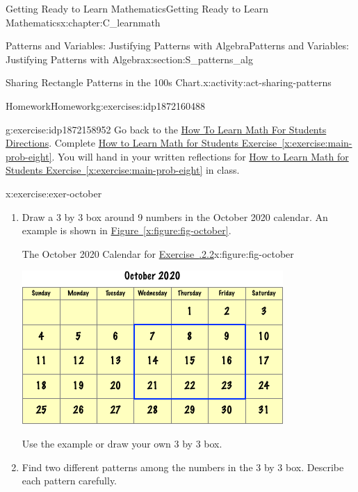 \documentclass[oneside,10pt,]{book}
\newcommand{\xreffont}{\relax}
\numberwithin{equation}{chapter}
\begin{document}
\begin{chapterptx}{Getting Ready to Learn Mathematics}{}{Getting Ready to Learn Mathematics}{}{}{x:chapter:C_learnmath}
\begin{sectionptx}{Patterns and Variables: Justifying Patterns with Algebra}{}{Patterns and Variables: Justifying Patterns with Algebra}{}{}{x:section:S_patterns_alg}
\begin{activity}{Sharing Rectangle Patterns in the 100s Chart.}{x:activity:act-sharing-patterns}
\end{activity}%
%
%
\typeout{************************************************}
\typeout{************************************************}
%
\begin{exercises-subsection}{Homework}{}{Homework}{}{}{g:exercises:idp1872160488}
\begin{divisionexercise}{1}{}{}{g:exercise:idp1872158952}%
Go back to the \hyperlink{x:paragraphs:htlmfs-directions}{How To Learn Math For Students Directions}. Complete \hyperref[x:exercise:main-prob-eight]{How to Learn Math for Students Exercise~{\xreffont\ref{x:exercise:main-prob-eight}}}. You will hand in your written reflections for \hyperref[x:exercise:main-prob-eight]{How to Learn Math for Students Exercise~{\xreffont\ref{x:exercise:main-prob-eight}}} in class.%
\end{divisionexercise}%
\begin{divisionexercise}{2}{}{}{x:exercise:exer-october}%
\begin{enumerate}[font=\bfseries,label=(\alph*),ref=\alph*]
\item{}Draw a 3 by 3 box around 9 numbers in the October 2020 calendar. An example is shown in \hyperref[x:figure:fig-october]{Figure~{\xreffont\ref{x:figure:fig-october}}}.%
\begin{figureptx}{The October 2020 Calendar for \hyperlink{x:exercise:exer-october}{Exercise~{\xreffont 1.8.2.2}}}{x:figure:fig-october}{}%
\begin{image}{0.15}{0.7}{0.15}%
\includegraphics[width=\linewidth]{external/oct-calendar.pdf}
\end{image}%
\tcblower
\end{figureptx}%
Use the example or draw your own 3 by 3 box.%
\item\label{x:task:tsk-oct-b}Find two different patterns among the numbers in the 3 by 3 box. Describe each pattern carefully.%

\end{enumerate}
\end{divisionexercise}
\end{exercises-subsection}
\end{sectionptx}
\end{chapterptx}
\end{document}
